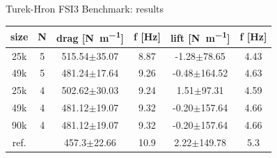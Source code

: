 \documentclass[10pt,t]{beamer}
\begin{document}
\begin{frame}{Turek-Hron FSI3 Benchmark: results}
\footnotesize
\begin{table}[h!]
\label{tab:fsi3_f}
\begin{center}
\begin{tabular}{ c | c | c c | c c  }
size & N & drag [\si{N.m^{-1}}] & f [\si{Hz}] & lift [\si{N.m^{-1}}]  & f [\si{Hz}] \\
\hline
25k & 5   & 515.54$\pm$35.07 & 8.87 & -1.28$\pm$78.65 & 4.43   \\
\hline
49k & 5    & 481.24$\pm$17.64   & 9.26 & -0.48$\pm$164.52 & 4.63 \\
\hline
25k & 4   & 502.62$\pm$30.03 & 9.24 & 1.51$\pm$97.31 & 4.59   \\
\hline
49k & 4    & 481.12$\pm$19.07   & 9.32 & -0.20$\pm$157.64 & 4.66 \\
\hline
90k & 4    & 481.12$\pm$19.07   & 9.32 & -0.20$\pm$157.64 & 4.66 \\
\hline
\hline
ref. &   &  457.3$\pm$22.66  & 10.9 & 2.22$\pm$149.78 & 5.3  \\
\hline
\end{tabular}
\end{center}
\end{table}

\end{frame}
\end{document}
